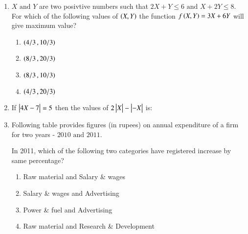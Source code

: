 \documentclass[journal,12pt,onecolumn]{IEEEtran}
\theoremstyle{remark}
\begin{document}
\begin{enumerate}[start = 26 ]
        \item $X \text{ and } Y$ are two posivtive numbers such that $2X + Y \leq 6 \text{ and } X + 2Y \leq 8$. For which of the following values of $\left(X,Y\right)$ the function $f\left(X,Y\right) = 3X + 6Y$ will give maximum value? \hfill{}
            \begin{enumerate}
                \item $\left(4/3\,, 10/3\right)$
                \item $\left(8/3\,, 20/3\right)$
                \item $\left(8/3\,, 10/3\right)$
                \item $\left(4/3\,, 20/3\right)$
            \end{enumerate}
        \newpage
        \item If $\begin{vmatrix}4X - 7\end{vmatrix} = 5$ then the values of $2\begin{vmatrix}X\end{vmatrix} - \begin{vmatrix}-X\end{vmatrix}$ is: \hfill{}
            \begin{enumerate}
            \end{enumerate}

         \item Following table provides figures (in rupees) on annual expenditure of a firm for two years - $2010 \text{ and }2011$.   \hfill{}
            \begin{table}[H]
                \centering
                
            \end{table}

            In 2011, which of the following two categories have registered increase by same percentage?
            \begin{enumerate}
                \item Raw material and Salary \& wages
                \item Salary \& wages and Advertising
                \item Power \& fuel and Advertising
                \item Raw material and Research \& Development
            \end{enumerate}


\end{enumerate}
\end{document}
